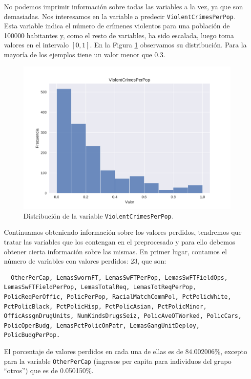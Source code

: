 \documentclass[a4paper, 20pt]{article}
\begin{document}
No podemos imprimir información sobre todas las variables a la vez, ya que son demasiadas. Nos interesamos en la variable a predecir \texttt{ViolentCrimesPerPop}. Esta variable indica el número de crímenes violentos para una población de 100000 habitantes y, como el resto de variables, ha sido escalada, luego toma valores en el intervalo $[0,1]$. En la Figura \ref{fig:histVCPP} observamos su distribución. Para la mayoría de los ejemplos tiene un valor menor que 0.3.

\begin{figure}[H]
    \centering
    \includegraphics[width=\textwidth]{HistViolentCrimesPerPop}
    \caption{Distribución de la variable \texttt{ViolentCrimesPerPop}.}
    \label{fig:histVCPP}
\end{figure}

Continuamos obteniendo información sobre los valores perdidos, tendremos que tratar las variables que los contengan en el preprocesado y para ello debemos obtener cierta información sobre las mismas. En primer lugar, contamos el número de variables con valores perdidos: 23, que son:

\begin{lstlisting}
  OtherPerCap, LemasSwornFT, LemasSwFTPerPop, LemasSwFTFieldOps, LemasSwFTFieldPerPop, LemasTotalReq, LemasTotReqPerPop, PolicReqPerOffic, PolicPerPop, RacialMatchCommPol, PctPolicWhite, PctPolicBlack, PctPolicHisp, PctPolicAsian, PctPolicMinor, OfficAssgnDrugUnits, NumKindsDrugsSeiz, PolicAveOTWorked, PolicCars, PolicOperBudg, LemasPctPolicOnPatr, LemasGangUnitDeploy, PolicBudgPerPop.
\end{lstlisting}

El porcentaje de valores perdidos en cada una de ellas es de 84.002006\%, excepto para la variable \texttt{OtherPerCap} (ingresos per capita para individuos del grupo ``otros'')  que es de 0.050150\%.
\end{document}
